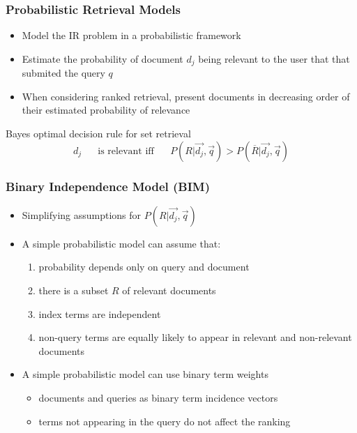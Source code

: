 \documentclass[svgnames]{beamer}
\begin{document}
\begin{frame}  \frametitle{Probabilistic Retrieval Models}

    \begin{itemize}
    \item Model the IR problem in a probabilistic framework
    \item Estimate the probability of document $d_j$ being relevant to the user that that submited the query $q$
    \item When considering ranked retrieval, present documents in decreasing order of their estimated probability of relevance
    \end{itemize}
    
    \begin{block}{Bayes optimal decision rule for set retrieval}
      \begin{displaymath}
          d_j \text{~~~~~is relevant iff~~~~~} P(R|\vec{d_j},\vec{q}) > P(\overline{R}|\vec{d_j},\vec{q})
      \end{displaymath}
    \end{block}
\end{frame}

\begin{frame}  \frametitle{Binary Independence Model (BIM)}
  \begin{block}{}
    \begin{itemize}
    \item Simplifying assumptions for $P(R|\vec{d_j},\vec{q})$
    \item A simple probabilistic model can assume that:
      \begin{enumerate}
      \item probability depends only on query and document
      \item there is a subset $R$ of relevant documents
      \item index terms are independent
      \item non-query terms are equally likely to appear in relevant and non-relevant documents
      \end{enumerate}
    \item A simple probabilistic model can use binary term weights
      \begin{itemize}
      \item documents and queries as binary term incidence vectors
      \item terms not appearing in the query do not affect the ranking
      \end{itemize}
    \end{itemize}
  \end{block}

\end{frame}
\end{document}

